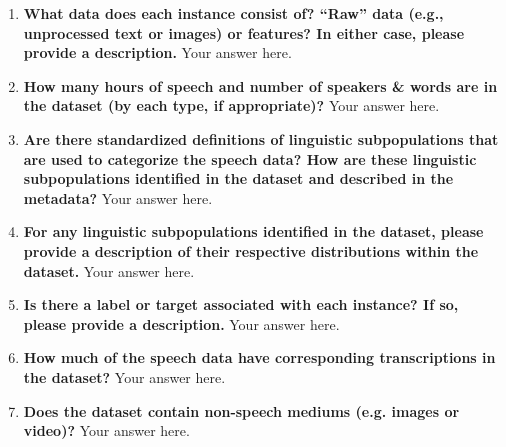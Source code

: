 \documentclass{article}
\begin{document}
\begin{enumerate}[leftmargin=0.65cm]
        \item \textbf{What data does each instance consist of? “Raw” data (e.g., unprocessed text or images) or features? In either case, please provide a description.}
         \newline 
        Your answer here.
        \newline 
        
        \item \textbf{How many hours of speech and number of speakers & words are in the dataset (by each type, if appropriate)?} 
        \newline 
        Your answer here.
        \newline 
        
        \item \textbf{Are there standardized definitions of linguistic subpopulations that are used to categorize the speech data? How are these linguistic subpopulations identified in the dataset and described in the metadata?}
        \newline 
        Your answer here.
        \newline 
        
        \item \textbf{For any linguistic subpopulations identified in the dataset, please provide a description of their respective distributions within the dataset.}
        \newline 
        Your answer here.
        \newline 
        
        \item \textbf{Is there a label or target associated with each instance? If so, please provide a description.}
        \newline 
        Your answer here.
        \newline 
        
        \item \textbf{How much of the speech data have corresponding transcriptions in the dataset?}
        \newline 
        Your answer here.
        \newline 
        
        \item \textbf{Does the dataset contain non-speech mediums (e.g. images or video)?}
        \newline 
        Your answer here.
        \newline 
        

\end{enumerate}
\end{document}
